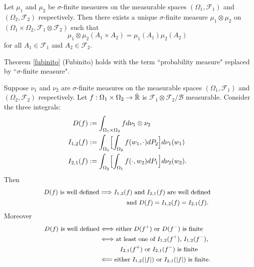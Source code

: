 \begin{theorem}
Let $\mu_1$ and $\mu_2$ be $\sigma$-finite measures on the measurable spaces $(\Omega_1,\mathcal F_1)$ and $(\Omega_2,\mathcal F_2)$ respectively. Then there exists a unique $\sigma$-finite measure $\mu_1\otimes \mu_2$ on $(\Omega_1\times \Omega_2,\mathcal F_1\otimes \mathcal F_2 )$ such that
\[ \mu_1\otimes \mu_2(A_1\times A_2)= \mu_1(A_1)\mu_2(A_2) \]
 for all $A_1\in\mathcal F_1$ and $A_2\in \mathcal F_2$.
\end{theorem}

\begin{theorem}[{\bf Fubini}]
Theorem \ref{fubinito} (Fubinito) holds with the term ``probability measure" replaced by ``$\sigma$-finite measure".
\end{theorem}



\begin{corollary} Suppose $\nu_1$ and $\nu_2$ are $\sigma$-finite measures on the measurable spaces $(\Omega_1,\mathcal F_1)$ and  $( \Omega_2, \mathcal F_2)$ respectively. Let $f:\Omega_1\times\Omega_2\rightarrow \bar{\Bbb R}$ is $\mathcal F_1\otimes \mathcal F_2/\mathcal B$ measurable. Consider the three integrals:
\begin{align*}
D(f)&:= \int_{\Omega_1\times\Omega_2} f d\nu_1\otimes \nu_2 \\
 I_{1,2}(f)&:= \int_{\Omega_1}\Bigl[ \int_{\Omega_2} f(w_1,\cdot) dP_2 \Bigr] d\nu_1(w_1)\\
 I_{2,1}(f)&:=\int_{\Omega_2}\Bigl[ \int_{\Omega_1} f(\cdot,w_2) dP_1 \Bigr] d\nu_2(w_2).
\end{align*}
Then
\begin{align*}
\text{\small $D(f)$ is well defined} &\Longrightarrow \text{\small $I_{1,2}(f)$ and $I_{2,1}(f)$ are well defined}\\
&\qquad\qquad\text{\small and $D(f)= I_{1,2}(f)= I_{2,1}(f)$}.
 \end{align*}
Moreover
\begin{align*}
\text{\small $D(f)$ is well defined} &\Longleftrightarrow\text{\small either $D(f^+)$ or $D(f^-)$ is finite}\\
&\Longleftrightarrow\text{\small at least one of $I_{1,2}(f^+)$, $I_{1,2}(f^-)$,}\\
&\qquad\quad\text{\small $I_{2,1}(f^+)$ or $I_{2,1}(f^-)$ is finite}\\
&\Longleftarrow \text{\small either $I_{1,2}(|f|)$ or $I_{2,1}(|f|)$ is finite.}\\
\end{align*}
\end{corollary}


